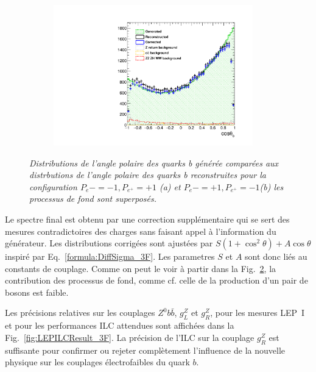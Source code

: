 \begin{figure}
\begin{subfigure}{0.5\textwidth}
		\centering
		\includegraphics[width=0.95\textwidth]{ILD/plots/basymmetry-final-right.pdf}
		\caption{\label{fig:BAsymmetryFinal_b_3F} }
	\end{subfigure}
	\caption{\sl Distributions de l'angle polaire des quarks b générée comparées aux distrbutions de l'angle polaire des quarks b reconstruites pour la configuration $P_{e}-=-1, P_{e^+}=+1$ (a) et $P_{e}-=+1, P_{e^+}=-1$(b) les processus de fond sont superposés.}
	\label{fig:BAsymmetryFinal_3F}
\end{figure}

Le spectre final est obtenu par une correction supplémentaire qui se sert des mesures contradictoires des charges sans faisant appel à l'information du générateur.  %
Les distributions corrigées sont ajustées par $S(1+\cos^2\theta) + A\cos\theta$ inspiré par Eq.~\ref{formula:DiffSigma_3F}. Les parametres $S$ et $A$ sont donc liés au constants de couplage. 
Comme on peut le voir à partir dans la Fig.~\ref{fig:BAsymmetryFinal_3F}, la contribution des processus de fond, comme cf. celle de la production d'un pair de bosons est faible.


Les précisions relatives sur les couplages $Z^0 b\bar{b}$, $g_L^Z$ et $g_R^Z$, pour les mesures LEP~I et pour les performances ILC attendues sont affichées dans la Fig.~\ref{fig:LEPILCResult_3F}.
La précision de l'ILC sur la couplage $g_R^Z$ est suffisante pour confirmer ou rejeter complètement l'influence de la nouvelle physique sur les couplages électrofaibles du quark $b$.

